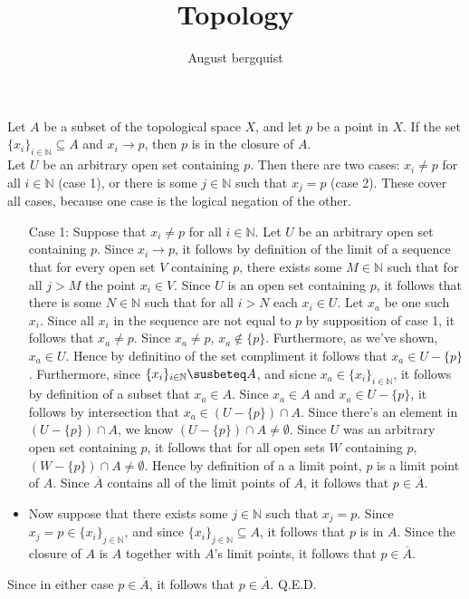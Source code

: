 \documentclass{article}
\title{Topology}
\author{August bergquist}
\newcommand{\N}{\mathbb{N}}
\begin{document}
Let $A$ be a subset of the topological space $X$, and let $p$ be a point in $X$. If the set $\{x_i\}_{i\in \N}\subseteq A$ and $x_i \rightarrow p$, then $p$ is in the closure of $A$. \\

 Let $U$ be an arbitrary open set containing $p$. Then there are two cases: $x_i \ne p$ for all $i\in \N$ (case 1), or there is some $j\in \N$ such that $x_j = p$ (case 2). These cover all cases, because one case is the logical negation of the other.
\begin{itemize}
    \item[Case 1: ] Suppose that $x_i \ne p$ for all $i\in \N$. Let $U$ be an arbitrary open set containing $p$. Since $x_i \rightarrow p$, it follows by definition of the limit of a sequence that for every open set $V$ containing $p$, there exists some $M\in \N$ such that for all $j > M$ the point $x_i\in V$. Since $U$ is an open set containing $p$, it follows that there is some $N \in \N$ such that for all $i > N$ each $x_i\in U$. Let $x_a$ be one such $x_i$. Since all $x_i$ in the sequence are not equal to $p$ by supposition of case 1, it follows that $x_a \ne p$. Since $x_a \ne p$, $x_a \not \in \{p\}$. Furthermore, as we've shown, $x_a\in U$. Hence by definitino of the set compliment it follows that $x_a \in U - \{p\}$. Furthermore, since $\{x_i\}_{i\in \N} \susbeteq A$, and sicne $x_a\in\{x_i\}_{i\in \N} $, it follows by definition of a subset that $x_a \in A$. Since $x_a\in A$ and $x_a\in U-\{p\}$, it follows by intersection that $x_a \in (U -\{p\})\cap A$. Since there's an element in $(U -\{p\})\cap A$, we know $(U -\{p\})\cap A \ne \emptyset$. Since $U$ was an arbitrary open set containing $p$, it follows that for all open sets $W$ containing $p$, $(W-\{p\})\cap A \ne \emptyset$. Hence by definition of a a limit point, $p$ is a limit point of $A$. Since $\overline{A}$ contains all of the limit points of $A$, it follows that $p\in \overline{A}$.
    \item Now suppose that there exists some $j\in \N$ such that $x_j = p$. Since $x_j = p\in \{x_i\}_{j\in \N}$, and since $\{x_i\}_{j\in \N}\subseteq A$, it follows that $p$ is in $A$. Since the closure of $A$ is $A$ together with $A$'s limit points, it follows that $p\in \overline{A}.$
\end{itemize}
Since in either case $p\in \overline{A}$, it follows that $p\in \overline{A}$. Q.E.D.\\
\end{document}
